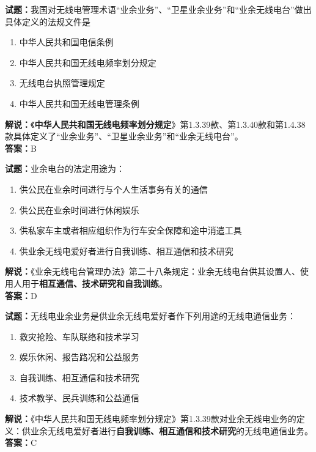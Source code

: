 \documentclass{ctexbook}
\begin{document}
\bigskip




\noindent\textbf{试题：}我国对无线电管理术语“业余业务”、“卫星业余业务”和“业余无线电台”做出具体定义的法规文件是
\begin{enumerate}[leftmargin=3em]
\item 中华人民共和国电信条例
\item 中华人民共和国无线电频率划分规定
\item 无线电台执照管理规定
\item 中华人民共和国无线电管理条例
\end{enumerate}
\textbf{解说：}《\textbf{中华人民共和国无线电频率划分规定}》第1.3.39款、第1.3.40款和第1.4.38款具体定义了“业余业务”、“卫星业余业务”和“业余无线电台”。\\\noindent\textbf{答案：}B

\bigskip




\noindent\textbf{试题：}业余电台的法定用途为：
\begin{enumerate}[leftmargin=3em]
\item 供公民在业余时间进行与个人生活事务有关的通信
\item 供公民在业余时间进行休闲娱乐
\item 供私家车主或者相应组织作为行车安全保障和途中消遣工具
\item 供业余无线电爱好者进行自我训练、相互通信和技术研究
\end{enumerate}
\noindent\textbf{解说：}《业余无线电台管理办法》第二十八条规定：业余无线电台供其设置人、使用人用于\textbf{相互通信、技术研究和自我训练}。\\\noindent\textbf{答案：}D

\bigskip




\noindent\textbf{试题：}无线电业余业务是供业余无线电爱好者作下列用途的无线电通信业务：
\begin{enumerate}[leftmargin=3em]
\item 救灾抢险、车队联络和技术学习
\item 娱乐休闲、报告路况和公益服务
\item 自我训练、相互通信和技术研究
\item 技术教学、民兵训练和公益通信
\end{enumerate}
\noindent\textbf{解说：}《中华人民共和国无线电频率划分规定》第1.3.39款对业余无线电业务的定义：供业余无线电爱好者进行\textbf{自我训练、相互通信和技术研究}的无线电通信业务。\\\noindent\textbf{答案：}C
\end{document}
